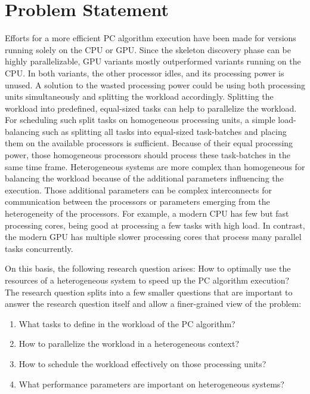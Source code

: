 \chapter{Problem Statement}
\label{chap:problem_statement}
Efforts for a more efficient PC algorithm execution have been made for versions running solely on the CPU or GPU. Since the skeleton discovery phase can be highly parallelizable, GPU variants mostly outperformed variants running on the CPU. In both variants, the other processor idles, and its processing power is unused. A solution to the wasted processing power could be using both processing units simultaneously and splitting the workload accordingly.
Splitting the workload into predefined, equal-sized tasks can help to parallelize the workload. For scheduling such split tasks on homogeneous processing units, a simple load-balancing such as splitting all tasks into equal-sized task-batches and placing them on the available processors is sufficient.
Because of their equal processing power, those homogeneous processors should process these task-batches in the same time frame.
Heterogeneous systems are more complex than homogeneous for balancing the workload because of the additional parameters influencing the execution. Those additional parameters can be complex interconnects for communication between the processors or parameters emerging from the heterogeneity of the processors. For example, a modern CPU has few but fast processing cores, being good at processing a few tasks with high load. In contrast, the modern GPU has multiple slower processing cores that process many parallel tasks concurrently.

On this basis, the following research question arises: How to optimally use the resources of a heterogeneous system to speed up the PC algorithm execution?
The research question splits into a few smaller questions that are important to answer the research question itself and allow a finer-grained view of the problem:

\begin{enumerate}
  \item What tasks to define in the workload of the PC algorithm?
  \item How to parallelize the workload in a heterogeneous context?
  \item How to schedule the workload effectively on those processing units?
  \item What performance parameters are important on heterogeneous systems?
\end{enumerate}

